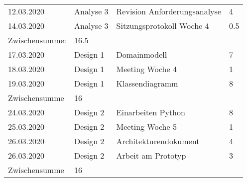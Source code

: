 \documentclass[
	ngerman,
	toc=listof, %
	toc=bibliography, %
	footnotes=multiple, %
	parskip=half, %
	numbers=noendperiod %
]{scrartcl}
\begin{document}
\begin{tabularx}{\textwidth}{llXl}
		12.03.2020 & Analyse 3 & Revision Anforderungsanalyse & 4 \\
		14.03.2020 & Analyse 3 & Sitzungsprotokoll Woche 4 & 0.5 \\
		\midrule
		Zwischensumme: & 16.5 & & \\
		\midrule
		17.03.2020 & Design 1 & Domainmodell & 7 \\
		18.03.2020 & Design 1 & Meeting Woche 4 & 1 \\
		19.03.2020 & Design 1 & Klassendiagramm & 8 \\
		\midrule
		Zwischensumme & 16 & & \\
		\midrule
		24.03.2020 & Design 2 & Einarbeiten Python & 8 \\
		25.03.2020 & Design 2 & Meeting Woche 5 & 1 \\
		26.03.2020 & Design 2 & Architekturendokument & 4 \\
		26.03.2020 & Design 2 & Arbeit am Prototyp & 3 \\
		\midrule
		Zwischensumme & 16 & & \\
		\bottomrule
	\end{tabularx}
\end{document}
